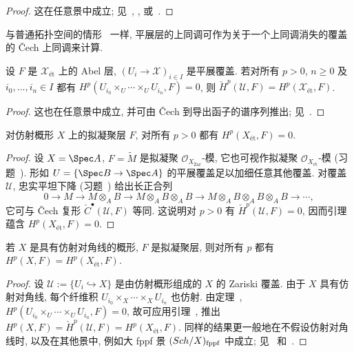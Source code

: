\begin{proof}
这在任意景中成立; 见~\cite[II.5.9.2]{God58}, \cite[命题 III.2.12]{Mil80}, \cite[Tag 03F9]{SP} 或~\cite[命题 2.3.15]{Ols16}.
\end{proof}
与普通拓扑空间的情形~\cite[习题 III.4.11]{Har77} 一样, 平展层的上同调可作为关于一个上同调消失的覆盖的 Čech 上同调来计算.
\begin{lemma}\label{src:5.1.39}
设 $F$ 是 $\mathcal X_{\text{ét}}$ 上的 Abel 层, $(U_i\to\mathcal X)_{i\in I}$ 是平展覆盖. 若对所有 $p>0$, $n\geq0$ 及 $i_0,\ldots,i_n\in I$ 都有 $H^p(U_{i_0}\times_U\cdots\times_U U_{i_n},F)=0$, 则 $\check H^p(\mathcal U,F)=H^p(\mathcal X_{\text{ét}},F)$.
\end{lemma}
\begin{proof}
这也在任意景中成立, 并可由 Čech 到导出函子的谱序列推出; 见~\cite[Tag 03F7]{SP}.
\end{proof}
\begin{theorem}\label{src:5.1.40}
对仿射概形 $X$ 上的拟凝聚层 $F$, 对所有 $p>0$ 都有 $H^p(X_{\text{ét}},F)=0$.
\end{theorem}
\begin{proof}
设 $X=\Spec A$, $F=\widetilde M$ 是拟凝聚 $\mathcal O_{X_{\mathrm{Zar}}}$-模, 它也可视作拟凝聚 $\mathcal O_{X_{\text{ét}}}$-模 (习题~). 形如 $\mathcal U=\{\Spec B\to\Spec A\}$ 的平展覆盖足以加细任意其他覆盖. 对覆盖 $\mathcal U$, 忠实平坦下降 (习题~) 给出长正合列
\[
0\longrightarrow M\longrightarrow M\otimes_A B\longrightarrow M\otimes_A B\otimes_A B\longrightarrow M\otimes_A B\otimes_A B\otimes_A B\longrightarrow\cdots,
\]
它可与 Čech 复形 $\check C^\bullet(\mathcal U,F)$ 等同. 这说明对 $p>0$ 有 $\check H^p(\mathcal U,F)=0$, 因而引理~ 蕴含 $H^p(X_{\text{ét}},F)=0$.
\end{proof}
\begin{proposition}\label{src:5.1.41}
若 $X$ 是具有仿射对角线的概形, $F$ 是拟凝聚层, 则对所有 $p$ 都有 $H^p(X,F)=H^p(X_{\text{ét}},F)$.
\end{proposition}
\begin{proof}
设 $\mathcal U:=\{U_i\hookrightarrow X\}$ 是由仿射概形组成的 $X$ 的 Zariski 覆盖. 由于 $X$ 具有仿射对角线, 每个纤维积 $U_{i_0}\times_X\cdots\times_X U_{i_n}$ 也仿射. 由定理~, $H^p(U_{i_0}\times_U\cdots\times_U U_{i_n},F)=0$, 故可应用引理~, 推出 $H^p(X,F)=\check H^p(\mathcal U,F)=H^p(X_{\text{ét}},F)$. 同样的结果更一般地在不假设仿射对角线时, 以及在其他景中, 例如大 fppf 景 $(Sch/X)_{\mathrm{fppf}}$ 中成立; 见~\cite[命题 3.7]{Mil80} 和~\cite[Tag 03DW]{SP}.
\end{proof}
